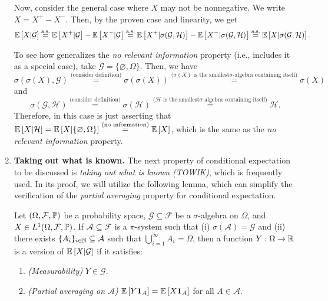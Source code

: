 \begin{enumerate}
\begin{pf}
Now, consider the general case where \(X\) may not be nonnegative. We write
\(X=X^{+}-X^{-}\). Then, by the proven case and linearity, we get
\[
\mathbb{E}\left[X|\mathcal{G}\right]\overset{\text{a.s.}}= \mathbb{E}\left[X^{+}|\mathcal{G}\right]-\mathbb{E}\left[X^{-}|\mathcal{G}\right]
\overset{\text{a.s.}}=\mathbb{E}\left[X^{+}|\sigma(\mathcal{G},\mathcal{H})\right]
-\mathbb{E}\left[X^{-}|\sigma(\mathcal{G},\mathcal{H})\right]
\overset{\text{a.s.}}=\mathbb{E}\left[X|\sigma(\mathcal{G},\mathcal{H})\right].
\]
\end{pf}

To see how  generalizes the \emph{no
relevant information} property (i.e., includes it as a special case), take
\(\mathcal{G}=\{\varnothing,\Omega\}\). Then, we have
\[\sigma(\sigma(X),\mathcal{G})\overset{\text{(consider
definition)}}{=}\sigma(\sigma(X))\overset{\text{(\(\sigma(X)\) is the smallest
\(\sigma\)-algebra containing itself)}}{=}\sigma(X)\]
and 
\[\sigma(\mathcal{G},\mathcal{H})\overset{\text{(consider
definition)}}{=}\sigma(\mathcal{H})\overset{\text{(\(\mathcal{H}\) is the smallest
\(\sigma\)-algebra containing itself)}}{=}\mathcal{H}.\]
Therefore, in this case  is just
asserting that
\(\mathbb{E}\left[X|\mathcal{H}\right]=\mathbb{E}\left[X|\{\varnothing,\Omega\}\right]\overset{\text{(no
information)}}{=}\mathbb{E}\left[X\right]\), which is the same as the \emph{no relevant
information} property.
\item \textbf{Taking out what is known.} The next property of conditional
expectation to be discussed is \emph{taking out what is known (TOWIK)}, which
is frequently used. In its proof, we will utilize the following lemma, which
can simplify the verification of the \emph{partial averaging} property for
conditional expectation.
\begin{lemma}
\label{lma:part-avg-on-pi-sys}
Let \((\Omega,\mathcal{F},\mathbb{P})\) be a probability space, \(\mathcal{G}\subseteq
\mathcal{F}\) be a \(\sigma\)-algebra on \(\Omega\), and \(X\in
L^{1}(\Omega,\mathcal{F},\mathbb{P})\). If \(\mathcal{A}\subseteq \mathcal{F}\) is a
\(\pi\)-system such that (i) \(\sigma(\mathcal{A})=\mathcal{G}\) and (ii) there
exists \(\{A_i\}_{i\in\mathbb{N}}\subseteq \mathcal{A}\) such that
\(\bigcup_{i=1}^{\infty}A_i=\Omega\), then a function \(Y:\Omega\to\mathbb{R}\) is a
version of \(\mathbb{E}\left[X|\mathcal{G}\right]\) if it satisfies:
\begin{enumerate}[label={(\arabic*)}]
\item \emph{(Measurability)} \(Y\in\mathcal{G}\).
\item \emph{(Partial averaging on \(\mathcal{A}\))}
\(\mathbb{E}\left[Y\mathbf{1}_{A}\right]=\mathbb{E}\left[X\mathbf{1}_{A}\right]\) for all \(A\in\mathcal{A}\).
\end{enumerate}

\end{lemma}
\end{enumerate}
